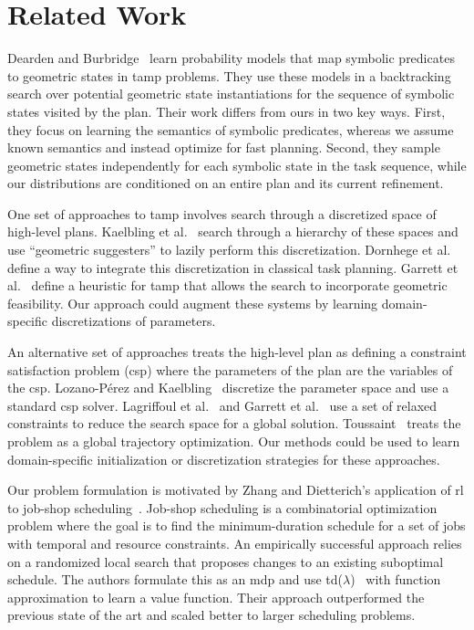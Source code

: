 \section{Related Work}
Dearden and Burbridge~\cite{deardenplanningtamp}
learn probability models that map symbolic predicates to
geometric states in {\sc tamp} problems. They use these models in a
backtracking search over potential geometric state instantiations for
the sequence of symbolic states visited by the plan.  Their work
differs from ours in two key ways. First, they focus on learning the
semantics of symbolic predicates, whereas we assume known semantics
and instead optimize for fast planning. Second, they sample geometric
states independently for each symbolic state in the task sequence,
while our distributions are conditioned on an entire plan and its
current refinement.

One set of approaches to {\sc tamp} involves search through a discretized space
of high-level plans. Kaelbling et al.~\cite{kaelbling2011hierarchical} search
through a hierarchy of these spaces and use ``geometric suggesters''
to lazily perform this discretization. Dornhege et
al.~\cite{dornhege2012semantic} define a way to integrate this
discretization in classical task planning. Garrett et
al.~\cite{GarrettWAFR14} define a heuristic for {\sc tamp} that allows
the search to incorporate geometric feasibility. Our approach could
augment these systems by learning domain-specific discretizations of
parameters.

An alternative set of approaches treats the high-level plan as defining a
constraint satisfaction problem ({\sc csp}) where the parameters of the plan
are the variables of the {\sc csp}. Lozano-P{\'e}rez and
Kaelbling~\cite{lozano2014constraint} discretize the parameter space
and use a standard {\sc csp} solver. Lagriffoul et
al.~\cite{lagriffoul2014orientation} and Garrett et
al.~\cite{garrett2015backward} use a set of relaxed constraints to
reduce the search space for a global
solution. Toussaint~\cite{toussaint2015logic} treats the problem as a
global trajectory optimization. Our methods could be used to learn
domain-specific initialization or discretization strategies for these
approaches.

Our problem formulation is motivated by Zhang and Dietterich's
application of {\sc rl} to job-shop
scheduling~\cite{JobShopSched}. Job-shop scheduling is a combinatorial
optimization problem where the goal is to find the minimum-duration
schedule for a set of jobs with temporal and resource constraints. An
empirically successful approach relies on a randomized
local search that proposes changes to an existing suboptimal
schedule. The authors formulate this as an {\sc mdp} and use {\sc
  td}($\lambda$)~\cite{suttonbarto} with function approximation to
learn a value function. Their approach outperformed the
previous state of the art and scaled better to larger scheduling problems.

